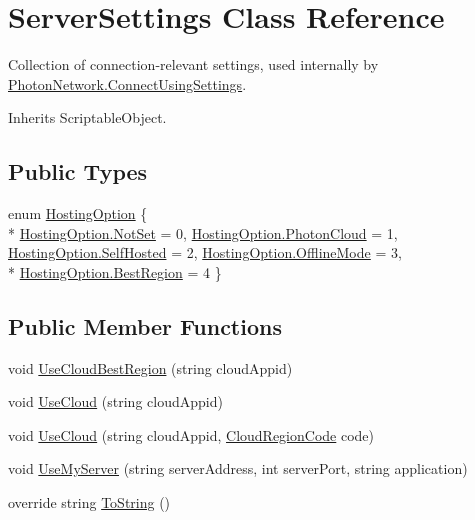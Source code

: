 \hypertarget{class_server_settings}{}\section{Server\+Settings Class Reference}
\label{class_server_settings}


Collection of connection-\/relevant settings, used internally by \hyperlink{class_photon_network_a0fdb79bcce45801ec81fbe56ffb939ec}{Photon\+Network.\+Connect\+Using\+Settings}.  




Inherits Scriptable\+Object.

\subsection*{Public Types}
\begin{DoxyCompactItemize}
\item 
enum \hyperlink{class_server_settings_ac70398ae8a3414ab1429069965cfcd32}{Hosting\+Option} \{ \\*
\hyperlink{class_server_settings_ac70398ae8a3414ab1429069965cfcd32afaf396cbd83927b72a84d2616fac76ff}{Hosting\+Option.\+Not\+Set} = 0, 
\hyperlink{class_server_settings_ac70398ae8a3414ab1429069965cfcd32a90530e0e762e9297f4d32ed392eabe8e}{Hosting\+Option.\+Photon\+Cloud} = 1, 
\hyperlink{class_server_settings_ac70398ae8a3414ab1429069965cfcd32a30679503fd5d3a59a6c5c5228d0077de}{Hosting\+Option.\+Self\+Hosted} = 2, 
\hyperlink{class_server_settings_ac70398ae8a3414ab1429069965cfcd32a08d79b550be04c0b3b76fc64a58efde0}{Hosting\+Option.\+Offline\+Mode} = 3, 
\\*
\hyperlink{class_server_settings_ac70398ae8a3414ab1429069965cfcd32a57561f889c64fb3f0a85f31a7fb1d941}{Hosting\+Option.\+Best\+Region} = 4
 \}
\end{DoxyCompactItemize}
\subsection*{Public Member Functions}
\begin{DoxyCompactItemize}
\item 
void \hyperlink{class_server_settings_aeb0c2bda5dd14905c6d82c5166971117}{Use\+Cloud\+Best\+Region} (string cloud\+Appid)
\item 
void \hyperlink{class_server_settings_a3fd2ceafc9192779c59a646884ba9810}{Use\+Cloud} (string cloud\+Appid)
\item 
void \hyperlink{class_server_settings_ae9dc8779d32a07848cb6e9063ae215d6}{Use\+Cloud} (string cloud\+Appid, \hyperlink{_enums_8cs_af823e3be9567fa753720895120c9819b}{Cloud\+Region\+Code} code)
\item 
void \hyperlink{class_server_settings_ae0eef79dfdcf1d7d7577094dadc4ca4b}{Use\+My\+Server} (string server\+Address, int server\+Port, string application)
\item 
override string \hyperlink{class_server_settings_a8a1c45242135b589ecc819e132c59655}{To\+String} ()
\end{DoxyCompactItemize}
